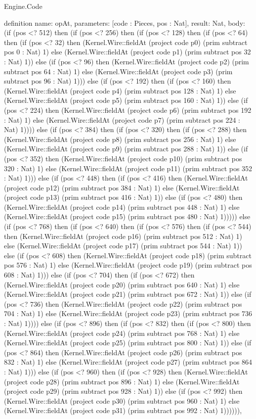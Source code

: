 \begin{lexlean}{Engine.Code}
\begin{semanticmodule}
definition{
  name: opAt,
  parameters: [code : Pieces, pos : Nat],
  result: Nat,
  body: (if (pos <? 512) then (if (pos <? 256) then (if (pos <? 128) then (if (pos <? 64) then (if (pos <? 32) then (Kernel.Wire::fieldAt (project code p0) (prim subtract pos 0 : Nat) 1) else (Kernel.Wire::fieldAt (project code p1) (prim subtract pos 32 : Nat) 1)) else (if (pos <? 96) then (Kernel.Wire::fieldAt (project code p2) (prim subtract pos 64 : Nat) 1) else (Kernel.Wire::fieldAt (project code p3) (prim subtract pos 96 : Nat) 1))) else (if (pos <? 192) then (if (pos <? 160) then (Kernel.Wire::fieldAt (project code p4) (prim subtract pos 128 : Nat) 1) else (Kernel.Wire::fieldAt (project code p5) (prim subtract pos 160 : Nat) 1)) else (if (pos <? 224) then (Kernel.Wire::fieldAt (project code p6) (prim subtract pos 192 : Nat) 1) else (Kernel.Wire::fieldAt (project code p7) (prim subtract pos 224 : Nat) 1)))) else (if (pos <? 384) then (if (pos <? 320) then (if (pos <? 288) then (Kernel.Wire::fieldAt (project code p8) (prim subtract pos 256 : Nat) 1) else (Kernel.Wire::fieldAt (project code p9) (prim subtract pos 288 : Nat) 1)) else (if (pos <? 352) then (Kernel.Wire::fieldAt (project code p10) (prim subtract pos 320 : Nat) 1) else (Kernel.Wire::fieldAt (project code p11) (prim subtract pos 352 : Nat) 1))) else (if (pos <? 448) then (if (pos <? 416) then (Kernel.Wire::fieldAt (project code p12) (prim subtract pos 384 : Nat) 1) else (Kernel.Wire::fieldAt (project code p13) (prim subtract pos 416 : Nat) 1)) else (if (pos <? 480) then (Kernel.Wire::fieldAt (project code p14) (prim subtract pos 448 : Nat) 1) else (Kernel.Wire::fieldAt (project code p15) (prim subtract pos 480 : Nat) 1))))) else (if (pos <? 768) then (if (pos <? 640) then (if (pos <? 576) then (if (pos <? 544) then (Kernel.Wire::fieldAt (project code p16) (prim subtract pos 512 : Nat) 1) else (Kernel.Wire::fieldAt (project code p17) (prim subtract pos 544 : Nat) 1)) else (if (pos <? 608) then (Kernel.Wire::fieldAt (project code p18) (prim subtract pos 576 : Nat) 1) else (Kernel.Wire::fieldAt (project code p19) (prim subtract pos 608 : Nat) 1))) else (if (pos <? 704) then (if (pos <? 672) then (Kernel.Wire::fieldAt (project code p20) (prim subtract pos 640 : Nat) 1) else (Kernel.Wire::fieldAt (project code p21) (prim subtract pos 672 : Nat) 1)) else (if (pos <? 736) then (Kernel.Wire::fieldAt (project code p22) (prim subtract pos 704 : Nat) 1) else (Kernel.Wire::fieldAt (project code p23) (prim subtract pos 736 : Nat) 1)))) else (if (pos <? 896) then (if (pos <? 832) then (if (pos <? 800) then (Kernel.Wire::fieldAt (project code p24) (prim subtract pos 768 : Nat) 1) else (Kernel.Wire::fieldAt (project code p25) (prim subtract pos 800 : Nat) 1)) else (if (pos <? 864) then (Kernel.Wire::fieldAt (project code p26) (prim subtract pos 832 : Nat) 1) else (Kernel.Wire::fieldAt (project code p27) (prim subtract pos 864 : Nat) 1))) else (if (pos <? 960) then (if (pos <? 928) then (Kernel.Wire::fieldAt (project code p28) (prim subtract pos 896 : Nat) 1) else (Kernel.Wire::fieldAt (project code p29) (prim subtract pos 928 : Nat) 1)) else (if (pos <? 992) then (Kernel.Wire::fieldAt (project code p30) (prim subtract pos 960 : Nat) 1) else (Kernel.Wire::fieldAt (project code p31) (prim subtract pos 992 : Nat) 1)))))),
}
\end{semanticmodule}
\end{lexlean}
